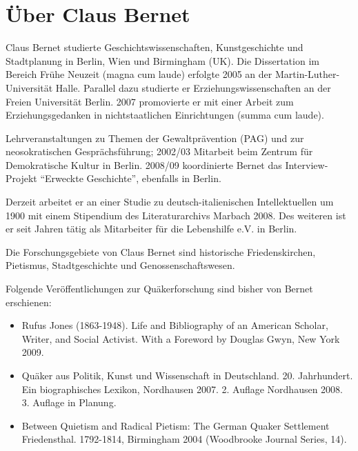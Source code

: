 \pagebreak


\section{Über Claus Bernet}
\begin{footnotesize}

Claus Bernet studierte Geschichtswissenschaften, Kunstgeschichte und
Stadtplanung in Berlin, Wien und Birmingham (UK). Die Dissertation im Bereich Frühe Neuzeit (magna cum laude)
erfolgte 2005 an der Martin-Luther-Universität Halle. Parallel dazu studierte er Erziehungswissenschaften an der Freien Universität Berlin.
2007 promovierte er mit einer Arbeit zum Erziehungsgedanken in nichtstaatlichen
Einrichtungen (summa cum laude).

\medskip

Lehrveranstaltungen zu Themen der Gewaltprävention (PAG) und zur neosokratischen
Gesprächsführung; 2002/03 Mitarbeit beim Zentrum für Demokratische Kultur in
Berlin. 2008/09 koordinierte Bernet das Interview-Projekt "`Erweckte
Geschichte"', ebenfalls in Berlin.

\medskip

Derzeit arbeitet er an einer Studie zu deutsch-italienischen Intellektuellen um
1900 mit einem Stipendium des Literaturarchivs Marbach 2008. Des weiteren ist er
seit Jahren tätig als Mitarbeiter für die Lebenshilfe e.V. in Berlin.

\medskip

Die Forschungsgebiete von Claus Bernet sind historische Friedenskirchen,
Pietismus, Stadtgeschichte und Genossenschaftswesen.

\medskip

Folgende Veröffentlichungen zur Quäkerforschung sind bisher von Bernet
erschienen:

\begin{itemize}
 \item Rufus Jones (1863-1948). Life and Bibliography of an American Scholar,
Writer, and Social Activist. With a Foreword by Douglas Gwyn, New York 2009.
 \item Quäker aus Politik, Kunst und Wissenschaft in Deutschland. 20.
Jahrhundert. Ein biographisches Lexikon, Nordhausen 2007. 2. Auflage Nordhausen
2008. 3. Auflage in Planung.
 \item Between Quietism and Radical Pietism: The German Quaker Settlement
Friedensthal. 1792-1814, Birmingham 2004 (Woodbrooke Journal Series, 14).
\end{itemize}


\end{footnotesize}
